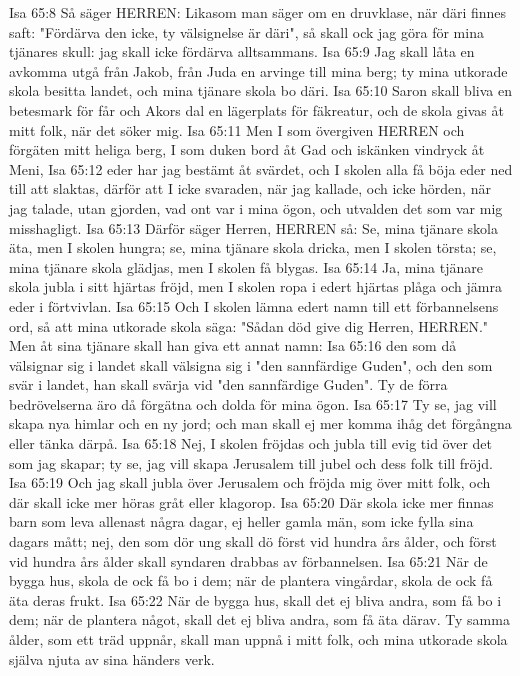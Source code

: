 Isa 65:8  Så säger HERREN: Likasom man säger om en druvklase, när däri finnes saft: "Fördärva den icke, ty välsignelse är däri", så skall ock jag göra för mina tjänares skull: jag skall icke fördärva alltsammans.
Isa 65:9  Jag skall låta en avkomma utgå från Jakob, från Juda en arvinge till mina berg; ty mina utkorade skola besitta landet, och mina tjänare skola bo däri.
Isa 65:10  Saron skall bliva en betesmark för får och Akors dal en lägerplats för fäkreatur, och de skola givas åt mitt folk, när det söker mig.
Isa 65:11  Men I som övergiven HERREN och förgäten mitt heliga berg, I som duken bord åt Gad och iskänken vindryck åt Meni,
Isa 65:12  eder har jag bestämt åt svärdet, och I skolen alla få böja eder ned till att slaktas, därför att I icke svaraden, när jag kallade, och icke hörden, när jag talade, utan gjorden, vad ont var i mina ögon, och utvalden det som var mig misshagligt.
Isa 65:13  Därför säger Herren, HERREN så: Se, mina tjänare skola äta, men I skolen hungra; se, mina tjänare skola dricka, men I skolen törsta; se, mina tjänare skola glädjas, men I skolen få blygas.
Isa 65:14  Ja, mina tjänare skola jubla i sitt hjärtas fröjd, men I skolen ropa i edert hjärtas plåga och jämra eder i förtvivlan.
Isa 65:15  Och I skolen lämna edert namn till ett förbannelsens ord, så att mina utkorade skola säga: "Sådan död give dig Herren, HERREN." Men åt sina tjänare skall han giva ett annat namn:
Isa 65:16  den som då välsignar sig i landet skall välsigna sig i "den sannfärdige Guden", och den som svär i landet, han skall svärja vid "den sannfärdige Guden". Ty de förra bedrövelserna äro då förgätna och dolda för mina ögon.
Isa 65:17  Ty se, jag vill skapa nya himlar och en ny jord; och man skall ej mer komma ihåg det förgångna eller tänka därpå.
Isa 65:18  Nej, I skolen fröjdas och jubla till evig tid över det som jag skapar; ty se, jag vill skapa Jerusalem till jubel och dess folk till fröjd.
Isa 65:19  Och jag skall jubla över Jerusalem och fröjda mig över mitt folk, och där skall icke mer höras gråt eller klagorop.
Isa 65:20  Där skola icke mer finnas barn som leva allenast några dagar, ej heller gamla män, som icke fylla sina dagars mått; nej, den som dör ung skall dö först vid hundra års ålder, och först vid hundra års ålder skall syndaren drabbas av förbannelsen.
Isa 65:21  När de bygga hus, skola de ock få bo i dem; när de plantera vingårdar, skola de ock få äta deras frukt.
Isa 65:22  När de bygga hus, skall det ej bliva andra, som få bo i dem; när de plantera något, skall det ej bliva andra, som få äta därav. Ty samma ålder, som ett träd uppnår, skall man uppnå i mitt folk, och mina utkorade skola själva njuta av sina händers verk.
